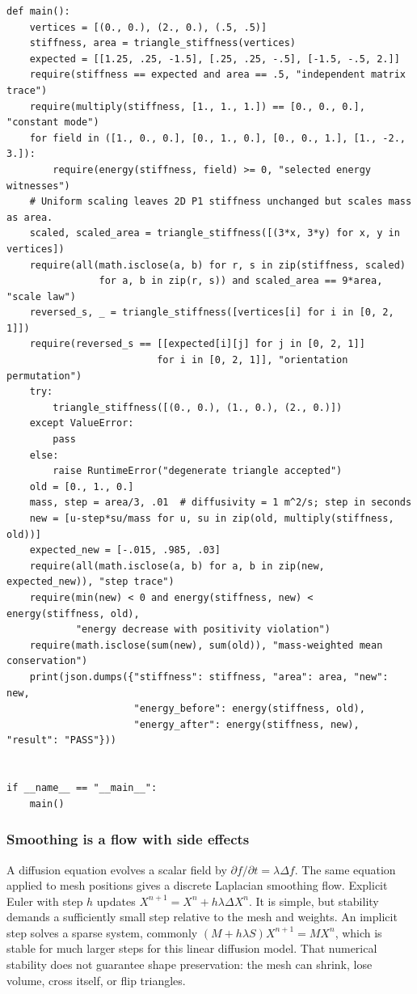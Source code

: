 \begin{verbatim}
def main():
    vertices = [(0., 0.), (2., 0.), (.5, .5)]
    stiffness, area = triangle_stiffness(vertices)
    expected = [[1.25, .25, -1.5], [.25, .25, -.5], [-1.5, -.5, 2.]]
    require(stiffness == expected and area == .5, "independent matrix trace")
    require(multiply(stiffness, [1., 1., 1.]) == [0., 0., 0.], "constant mode")
    for field in ([1., 0., 0.], [0., 1., 0.], [0., 0., 1.], [1., -2., 3.]):
        require(energy(stiffness, field) >= 0, "selected energy witnesses")
    # Uniform scaling leaves 2D P1 stiffness unchanged but scales mass as area.
    scaled, scaled_area = triangle_stiffness([(3*x, 3*y) for x, y in vertices])
    require(all(math.isclose(a, b) for r, s in zip(stiffness, scaled)
                for a, b in zip(r, s)) and scaled_area == 9*area, "scale law")
    reversed_s, _ = triangle_stiffness([vertices[i] for i in [0, 2, 1]])
    require(reversed_s == [[expected[i][j] for j in [0, 2, 1]]
                          for i in [0, 2, 1]], "orientation permutation")
    try:
        triangle_stiffness([(0., 0.), (1., 0.), (2., 0.)])
    except ValueError:
        pass
    else:
        raise RuntimeError("degenerate triangle accepted")
    old = [0., 1., 0.]
    mass, step = area/3, .01  # diffusivity = 1 m^2/s; step in seconds
    new = [u-step*su/mass for u, su in zip(old, multiply(stiffness, old))]
    expected_new = [-.015, .985, .03]
    require(all(math.isclose(a, b) for a, b in zip(new, expected_new)), "step trace")
    require(min(new) < 0 and energy(stiffness, new) < energy(stiffness, old),
            "energy decrease with positivity violation")
    require(math.isclose(sum(new), sum(old)), "mass-weighted mean conservation")
    print(json.dumps({"stiffness": stiffness, "area": area, "new": new,
                      "energy_before": energy(stiffness, old),
                      "energy_after": energy(stiffness, new), "result": "PASS"}))


if __name__ == "__main__":
    main()
\end{verbatim}

\subsubsection{Smoothing is a flow with side effects}\label{03-visual-computing-i-ch002-smoothing-is-a-flow-with-side-effects}

\hypertarget{03-visual-computing-i-ch002-smoothing-is-a-flow-with-side-effects}{}

A diffusion equation evolves a scalar field by \(\partial f/\partial t=\lambda\Delta f\). The same equation applied to mesh positions gives a discrete Laplacian smoothing flow. Explicit Euler with step \(h\) updates \(X^{n+1}=X^n+h\lambda\Delta X^n\). It is simple, but stability demands a sufficiently small step relative to the mesh and weights. An implicit step solves a sparse system, commonly \((M+h\lambda S)X^{n+1}=MX^n\), which is stable for much larger steps for this linear diffusion model. That numerical stability does not guarantee shape preservation: the mesh can shrink, lose volume, cross itself, or flip triangles.

